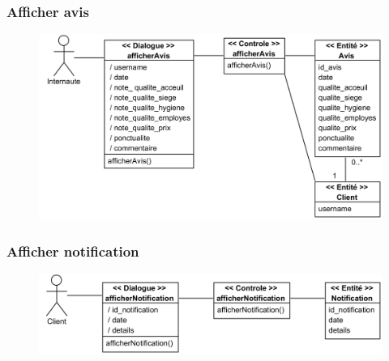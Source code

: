         \subsubsection[Consulter avis]{Afficher avis}
        \begin{figure}[H]
            \centering
            \includegraphics[width=130mm]{images/diagrammes-de-classes-participantes/afficher-avis Class Diagram.png}
            \label{fig:cpAffAvis}
        \end{figure}
        \subsubsection[Consulter notification]{Afficher notification}
        \begin{figure}[H]
            \centering
            \includegraphics[width=130mm]{images/diagrammes-de-classes-participantes/afficher-notification Class Diagram.png}
            \label{fig:cpAffNotif}
        \end{figure}
